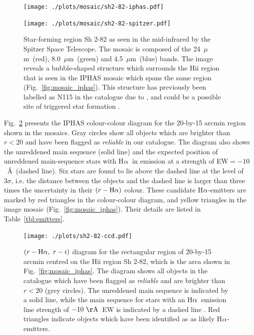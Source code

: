 \documentclass[useAMS,usenatbib]{mn2e}
\def\ha{\mbox{H$\rm \alpha$}}
\def\micron{\mbox{$\mu$m}}
\begin{document}
\begin{figure}
    \begin{minipage}[b]{0.78\linewidth}
        \texttt{[image: ./plots/mosaic/sh2-82-iphas.pdf]} 
    \end{minipage}
\caption{IPHAS-based mosaic of H{\sc ii} region Sh 2-82,
composed of \ha\ (red channel), $r$ (green channel) and $i$ (blue channel). Yellow triangles show the position of candidate \ha-emitters
which have been selected from the colour-colour diagram
in Fig.~\ref{fig:emitters}. Note that the H{\sc ii} region is surrounded by a faint blue/green reflection nebula
and dark cloud filaments.}
\label{fig:mosaic_iphas}
    \begin{minipage}[b]{0.78\linewidth}
        \texttt{[image: ./plots/mosaic/sh2-82-spitzer.pdf]} 
    \end{minipage}
    \caption{Star-forming region Sh 2-82 as seen in the mid-infrared
    by the Spitzer Space Telescope. The mosaic is composed of the 24~\micron\ (red), 8.0~\micron\ (green) and 4.5~\micron\ (blue) bands.
    The image reveals a bubble-shaped structure which surrounds the {\sc Hii} region that is seen in the IPHAS mosaic which spans the same region (Fig.~\ref{fig:mosaic_iphas}). 
    This structure has previously been labelled as N115 in the 
catalogue due to \citet{Churchwell2006}, and could be a possible site of triggered star formation \citep{Thompson2012,Kendrew2012}.}
    \label{fig:mosaic_spitzer}
\end{figure}

Fig.~\ref{fig:emitters} presents
the IPHAS colour-colour diagram for 
the 20-by-15 arcmin region shown in the mosaics.
Gray circles show all objects
which are brighter than $r<20$
and have been flagged as \emph{reliable}
in our catalogue.
The diagram also shows the unreddened main sequence (solid line)
and the expected position of unreddened main-sequence stars
with \ha\ in emission
at a strength of EW$=-10$~\AA\ (dashed line).
Six stars are found to lie above the 
dashed line at the level of $3\sigma$,
i.e. the distance between the objects and the dashed line
is larger than three times the uncertainty
in their $(r-\ha)$ colour.
These candidate \ha-emitters
are marked by red triangles in the colour-colour diagram,
and yellow triangles in the image mosaic (Fig.~\ref{fig:mosaic_iphas}).
Their details are listed in Table~\ref{tbl:emitters}.

\begin{figure}
  \texttt{[image: ./plots/sh2-82-ccd.pdf]}
    \caption{$(r-\ha,\ r-i)$ diagram for the rectangular region of 
    20-by-15 arcmin centred on the H{\sc ii} region Sh 2-82,
    which is the area shown in Fig.~\ref{fig:mosaic_iphas}.    
    The diagram shows all objects in the catalogue
    which have been flagged as \emph{reliable} and are brighter
    than $r<20$ (grey circles).
    The unreddened main sequence is indicated by a solid line,
    while the main sequence for stars with an \ha\ emission line
    strength of $-10~\rm{\AA}$~EW is indicated by a dashed line
    \citep[both based on the colour simulations by][]{Barentsen2011a}.
    Red triangles indicate objects which have been identified as
    as likely \ha-emitters.}
    \label{fig:emitters}
\end{figure}
\end{document}
